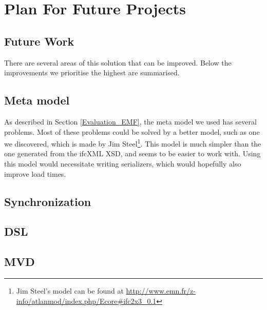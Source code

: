 \section{Plan For Future Projects}
\subsection{Future Work}
\label{sec:future_work}
There are several areas of this solution that can be improved. Below the improvements we prioritise the highest are summarised. 
\subsection{Meta model}
As described in Section \ref{Evaluation_EMF}, the meta model we used has several problems. Most of these problems could be solved by a better model, such as one we discovered, which is made by Jim Steel\footnote{Jim Steel's model can be found at \url{http://www.emn.fr/z-info/atlanmod/index.php/Ecore#ifc2x3_0.1}}. This model is much simpler than the one generated from the ifcXML XSD, and seems to be easier to work with. Using this model would necessitate writing serializers, which would hopefully also improve load times.
\subsection{Synchronization}
\subsection{DSL}
\subsection{MVD}
